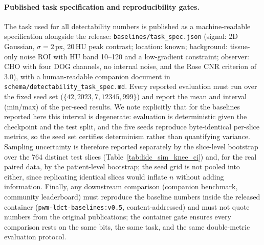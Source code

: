 \documentclass[twoside,11pt]{article}
\begin{document}
\paragraph{Published task specification and reproducibility gates.} The task used for all detectability numbers is published as a machine-readable specification alongside the release: \texttt{baselines/task\_spec.json} (signal: 2D Gaussian, $\sigma = 2$\,px, 20\,HU peak contrast; location: known; background: tissue-only noise ROI with HU band 10--120 and a low-gradient constraint; observer: CHO with four DOG channels, no internal noise, and the Rose CNR criterion of 3.0), with a human-readable companion document in \texttt{schema/detectability\_task\_spec.md}. Every reported evaluation must run over the fixed seed set ($\{42, 2023, 7, 12345, 999\}$) and report the mean and interval (min/max) of the per-seed results. We note explicitly that for the baselines reported here this interval is degenerate: evaluation is deterministic given the checkpoint and the test split, and the five seeds reproduce byte-identical per-slice metrics, so the seed set certifies determinism rather than quantifying variance. Sampling uncertainty is therefore reported separately by the slice-level bootstrap over the 764 distinct test slices (Table~\ref{tab:lidc_sim_knee_ci}) and, for the real paired data, by the patient-level bootstrap; the seed grid is not pooled into either, since replicating identical slices would inflate $n$ without adding information. Finally, any downstream comparison (companion benchmark, community leaderboard) must reproduce the baseline numbers inside the released container (\texttt{pwm-ldct-baselines:v0.5}, content-addressed) and must not quote numbers from the original publications; the container gate ensures every comparison rests on the same bits, the same task, and the same double-metric evaluation protocol.
\end{document}
